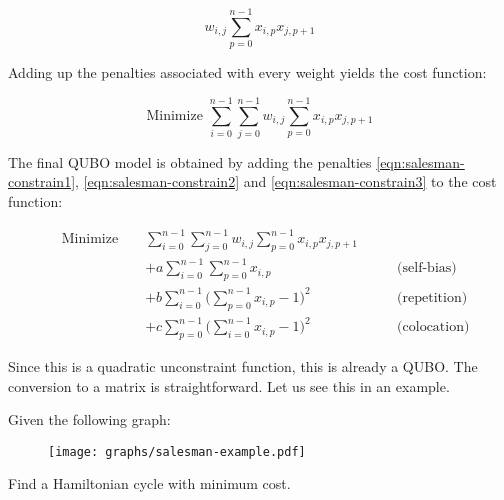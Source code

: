 $$ w_{i,j} \sum_{p=0}^{n-1} x_{i,p}x_{j,p+1} $$

Adding up the penalties associated with every weight yields the cost function:

$$ \text{Minimize } \sum_{i=0}^{n-1} \sum_{j=0}^{n-1} w_{i,j}\sum_{p=0}^{n-1} x_{i,p}x_{j,p+1} $$

The final QUBO model is obtained by adding the penalties \ref{eqn:salesman-constrain1}, \ref{eqn:salesman-constrain2} and \ref{eqn:salesman-constrain3} to the cost function:

\begin{equation}
	\begin{alignedat}{3}
		& \text{Minimize }	&& \sum_{i=0}^{n-1} \sum_{j=0}^{n-1} w_{i,j}\sum_{p=0}^{n-1} x_{i,p}x_{j,p+1} & \\
		& && + a \sum_{i=0}^{n-1} \sum_{p=0}^{n-1} x_{i,p} & \qquad \text{(self-bias)} \\
		& && + b \sum_{i=0}^{n-1} \Big( \sum_{p=0}^{n-1} x_{i,p} - 1 \Big)^2 & \qquad \text{(repetition)} \\
		& && + c \sum_{p=0}^{n-1} \Big( \sum_{i=0}^{n-1} x_{i,p} - 1 \Big)^2 & \qquad \text{(colocation)}
	\end{alignedat}
	\label{eqn:salesman-cost-funct}
\end{equation}


Since this is a quadratic unconstraint function, this is already a QUBO. The conversion to a matrix is straightforward. Let us see this in an example.


\label{sec:salesman-example}


Given the following graph:

\begin{figure}[H]
	\texttt{[image: graphs/salesman-example.pdf]}
	\centering
	\label{fig:salesman-graph} %
\end{figure}

Find a Hamiltonian cycle with minimum cost. 

